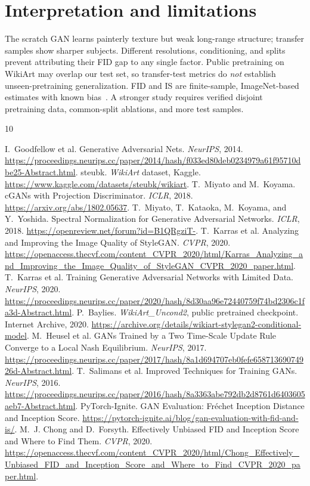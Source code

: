 \documentclass{article}
\begin{document}
\section{Interpretation and limitations}
The scratch GAN learns painterly texture but weak long-range structure; transfer samples show sharper subjects. Different resolutions, conditioning, and splits prevent attributing their FID gap to any single factor. Public pretraining on WikiArt may overlap our test set, so transfer-test metrics do \emph{not} establish unseen-pretraining generalization. FID and IS are finite-sample, ImageNet-based estimates with known bias~\cite{chong}. A stronger study requires verified disjoint pretraining data, common-split ablations, and more test samples.

\clearpage
\begin{thebibliography}{10}
\raggedright
{} I.~Goodfellow et al. Generative Adversarial Nets. \emph{NeurIPS}, 2014. \url{https://proceedings.neurips.cc/paper/2014/hash/f033ed80deb0234979a61f95710dbe25-Abstract.html}.
 steubk. \emph{WikiArt} dataset, Kaggle. \url{https://www.kaggle.com/datasets/steubk/wikiart}.
 T.~Miyato and M.~Koyama. cGANs with Projection Discriminator. \emph{ICLR}, 2018. \url{https://arxiv.org/abs/1802.05637}.
 T.~Miyato, T.~Kataoka, M.~Koyama, and Y.~Yoshida. Spectral Normalization for Generative Adversarial Networks. \emph{ICLR}, 2018. \url{https://openreview.net/forum?id=B1QRgziT-}.
 T.~Karras et al. Analyzing and Improving the Image Quality of StyleGAN. \emph{CVPR}, 2020. \url{https://openaccess.thecvf.com/content_CVPR_2020/html/Karras_Analyzing_and_Improving_the_Image_Quality_of_StyleGAN_CVPR_2020_paper.html}.
 T.~Karras et al. Training Generative Adversarial Networks with Limited Data. \emph{NeurIPS}, 2020. \url{https://proceedings.neurips.cc/paper/2020/hash/8d30aa96e72440759f74bd2306c1fa3d-Abstract.html}.
 P.~Baylies. \emph{WikiArt\_Uncond2}, public pretrained checkpoint. Internet Archive, 2020. \url{https://archive.org/details/wikiart-stylegan2-conditional-model}.
 M.~Heusel et al. GANs Trained by a Two Time-Scale Update Rule Converge to a Local Nash Equilibrium. \emph{NeurIPS}, 2017. \url{https://proceedings.neurips.cc/paper/2017/hash/8a1d694707eb0fefe65871369074926d-Abstract.html}.
 T.~Salimans et al. Improved Techniques for Training GANs. \emph{NeurIPS}, 2016. \url{https://proceedings.neurips.cc/paper/2016/hash/8a3363abe792db2d8761d6403605aeb7-Abstract.html}.
 PyTorch-Ignite. GAN Evaluation: Fr\'echet Inception Distance and Inception Score. \url{https://pytorch-ignite.ai/blog/gan-evaluation-with-fid-and-is/}.
 M.~J. Chong and D.~Forsyth. Effectively Unbiased FID and Inception Score and Where to Find Them. \emph{CVPR}, 2020. \url{https://openaccess.thecvf.com/content_CVPR_2020/html/Chong_Effectively_Unbiased_FID_and_Inception_Score_and_Where_to_Find_CVPR_2020_paper.html}.
\end{thebibliography}
\end{document}
